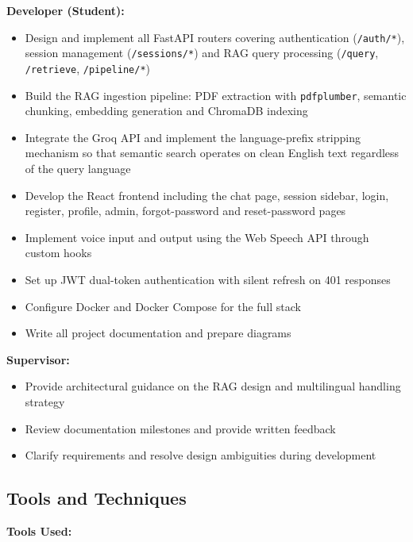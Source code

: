 \textbf{Developer (Student):}
\begin{itemize}
  \item Design and implement all FastAPI routers covering authentication
        (\texttt{/auth/*}), session management (\texttt{/sessions/*}) and RAG query
        processing (\texttt{/query}, \texttt{/retrieve}, \texttt{/pipeline/*})
  \item Build the RAG ingestion pipeline: PDF extraction with \texttt{pdfplumber},
        semantic chunking, embedding generation and ChromaDB indexing
  \item Integrate the Groq API and implement the language-prefix stripping mechanism so
        that semantic search operates on clean English text regardless of the query language
  \item Develop the React frontend including the chat page, session sidebar, login,
        register, profile, admin, forgot-password and reset-password pages
  \item Implement voice input and output using the Web Speech API through custom hooks
  \item Set up JWT dual-token authentication with silent refresh on 401 responses
  \item Configure Docker and Docker Compose for the full stack
  \item Write all project documentation and prepare diagrams
\end{itemize}

\textbf{Supervisor:}
\begin{itemize}
  \item Provide architectural guidance on the RAG design and multilingual handling strategy
  \item Review documentation milestones and provide written feedback
  \item Clarify requirements and resolve design ambiguities during development
\end{itemize}

\subsection{Tools and Techniques}

\textbf{Tools Used:}


